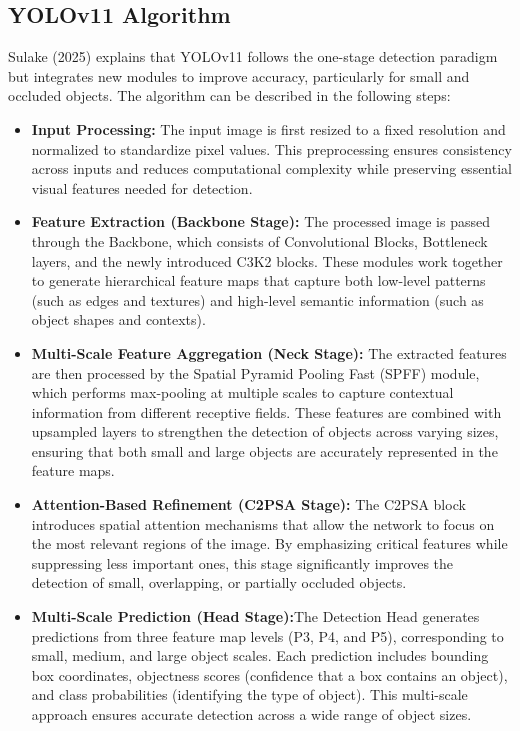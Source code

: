 \subsection{YOLOv11 Algorithm}
Sulake (2025) explains that YOLOv11 follows the one-stage detection paradigm but integrates new modules to improve accuracy, particularly for small and occluded objects. The algorithm can be described in the following steps:

\begin{itemize}
\item\textbf{Input Processing:} The input image is first resized to a fixed resolution and normalized to standardize pixel values. This preprocessing ensures consistency across inputs and reduces computational complexity while preserving essential visual features needed for detection.

\item\textbf{Feature Extraction (Backbone Stage):} The processed image is passed through the Backbone, which consists of Convolutional Blocks, Bottleneck layers, and the newly introduced C3K2 blocks. These modules work together to generate hierarchical feature maps that capture both low-level patterns (such as edges and textures) and high-level semantic information (such as object shapes and contexts).

\item\textbf{Multi-Scale Feature Aggregation (Neck Stage):} The extracted features are then processed by the Spatial Pyramid Pooling Fast (SPFF) module, which performs max-pooling at multiple scales to capture contextual information from different receptive fields. These features are combined with upsampled layers to strengthen the detection of objects across varying sizes, ensuring that both small and large objects are accurately represented in the feature maps.

\item\textbf{Attention-Based Refinement (C2PSA Stage):} The C2PSA block introduces spatial attention mechanisms that allow the network to focus on the most relevant regions of the image. By emphasizing critical features while suppressing less important ones, this stage significantly improves the detection of small, overlapping, or partially occluded objects.

\item\textbf{Multi-Scale Prediction (Head Stage):}The Detection Head generates predictions from three feature map levels (P3, P4, and P5), corresponding to small, medium, and large object scales. Each prediction includes bounding box coordinates, objectness scores (confidence that a box contains an object), and class probabilities (identifying the type of object). This multi-scale approach ensures accurate detection across a wide range of object sizes.


\end{itemize}
